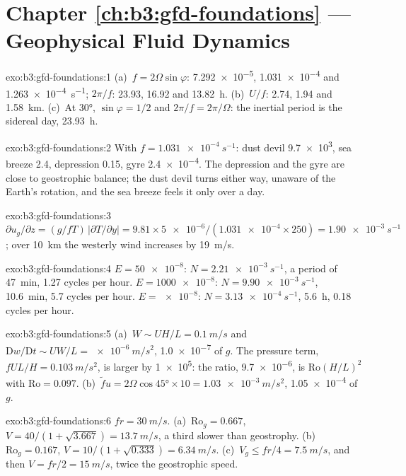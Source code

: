 \section*{Chapter \ref{ch:b3:gfd-foundations} --- Geophysical Fluid Dynamics}

\begin{solution}{exo:b3:gfd-foundations:1}
(a)~$f = 2\Omega\sin\varphi$: \num{7.292e-5}, \num{1.031e-4} and
\qty{1.263e-4}{s^{-1}}; $2\pi/f$: 23.93, 16.92 and \qty{13.82}{h}.
(b)~$U/f$: 2.74, 1.94 and \qty{1.58}{km}. (c)~At \ang{30}, $\sin\varphi =
1/2$ and $2\pi/f = 2\pi/\Omega$: the inertial period is the sidereal day,
\qty{23.93}{h}.
\end{solution}

\begin{solution}{exo:b3:gfd-foundations:2}
With $f = \qty{1.031e-4}{s^{-1}}$: dust devil \num{9.7e3}, sea breeze 2.4,
depression 0.15, gyre \num{2.4e-4}. The depression and the gyre are close to
geostrophic balance; the dust devil turns either way, unaware of the
Earth's rotation, and the sea breeze feels it only over a day.
\end{solution}

\begin{solution}{exo:b3:gfd-foundations:3}
$\partial u_g/\partial z = (g/fT)\,|\partial T/\partial y| = 9.81\times
\num{5e-6}/(\num{1.031e-4}\times250) = \qty{1.90e-3}{s^{-1}}$; over
\qty{10}{km} the westerly wind increases by \qty{19}{m/s}.
\end{solution}

\begin{solution}{exo:b3:gfd-foundations:4}
$E = \num{50e-8}$: $N = \qty{2.21e-3}{s^{-1}}$, a period of \qty{47}{min},
\num{1.27} cycles per hour. $E = \num{1000e-8}$: $N = \qty{9.90e-3}{s^{-1}}$,
\qty{10.6}{min}, 5.7 cycles per hour. $E = \num{e-8}$: $N =
\qty{3.13e-4}{s^{-1}}$, \qty{5.6}{h}, 0.18 cycles per hour.
\end{solution}

\begin{solution}{exo:b3:gfd-foundations:5}
(a)~$W \sim UH/L = \qty{0.1}{m/s}$ and $\mathrm Dw/\mathrm Dt \sim UW/L =
\qty{e-6}{m/s^2}$, \num{1.0e-7} of $g$. The pressure term, $fUL/H =
\qty{0.103}{m/s^2}$, is larger by \num{1e5}: the ratio, \num{9.7e-6}, is
$\mathrm{Ro}(H/L)^2$ with $\mathrm{Ro} = 0.097$. (b)~$\tilde fu =
2\Omega\cos\ang{45}\times10 = \qty{1.03e-3}{m/s^2}$, \num{1.05e-4} of $g$.
\end{solution}

\begin{solution}{exo:b3:gfd-foundations:6}
$fr = \qty{30}{m/s}$. (a)~$\mathrm{Ro}_g = 0.667$, $V = 40/(1 + \sqrt{3.667})
= \qty{13.7}{m/s}$, a third slower than geostrophy. (b)~$\mathrm{Ro}_g =
0.167$, $V = 10/(1 + \sqrt{0.333}) = \qty{6.34}{m/s}$. (c)~$V_g \le fr/4 =
\qty{7.5}{m/s}$, and then $V = fr/2 = \qty{15}{m/s}$, twice the geostrophic
speed.
\end{solution}

